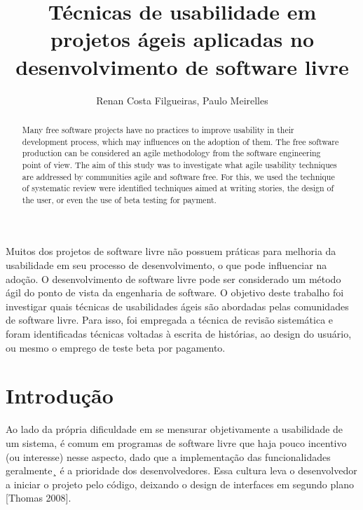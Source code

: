 \documentclass[12pt]{article}
\title{Técnicas de usabilidade em projetos ágeis aplicadas no desenvolvimento de software livre}
\author{Renan Costa Filgueiras, Paulo Meirelles}
\begin{document}
\maketitle
\begin{abstract}
Many free software projects have no practices to improve usability in their development process, which may influences on the adoption of them.
%
The free software production can be considered an agile methodology from the software engineering point of view.
%
The aim of this study was to investigate what agile usability techniques are addressed by communities agile and software free.
%
For this, we used the technique of systematic review were identified techniques aimed at writing stories, the design of the user, or even the use of beta testing for payment.

\end{abstract}

\begin{resumo}
Muitos dos projetos de software livre não possuem práticas para melhoria da usabilidade em seu processo de desenvolvimento, o que pode influenciar na adoção.
%
O desenvolvimento de software livre pode ser considerado um método ágil do ponto de vista da engenharia de software.
%
O objetivo deste trabalho foi investigar quais técnicas de usabilidades ágeis são abordadas pelas comunidades de software livre.
%
Para isso, foi empregada a técnica de revisão sistemática e foram identificadas técnicas voltadas à escrita de histórias, ao design do usuário, ou mesmo o emprego de teste beta por pagamento.

\end{resumo}

\section{Introdução}
\label{introducao}
Ao lado da própria dificuldade em se mensurar objetivamente a usabilidade de um sistema, é comum em programas de software livre que haja pouco incentivo (ou interesse) nesse aspecto, dado que a implementação das funcionalidades geralmente¸ é a prioridade dos desenvolvedores. Essa cultura leva o desenvolvedor a iniciar o projeto pelo código, deixando o design de interfaces em segundo plano [Thomas 2008].
%
\end{document}

